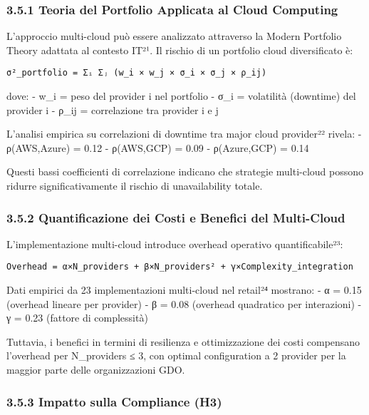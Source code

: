\documentclass{report}
\begin{document}
\subsubsection{3.5.1 Teoria del Portfolio Applicata al Cloud
Computing}\label{teoria-del-portfolio-applicata-al-cloud-computing}

L'approccio multi-cloud può essere analizzato attraverso la Modern
Portfolio Theory adattata al contesto IT²¹. Il rischio di un portfolio
cloud diversificato è:

\begin{verbatim}
σ²_portfolio = Σᵢ Σⱼ (w_i × w_j × σ_i × σ_j × ρ_ij)
\end{verbatim}

dove: - w\_i = peso del provider i nel portfolio - σ\_i = volatilità
(downtime) del provider i - ρ\_ij = correlazione tra provider i e j

L'analisi empirica su correlazioni di downtime tra major cloud
provider²² rivela: - ρ(AWS,Azure) = 0.12 - ρ(AWS,GCP) = 0.09 -
ρ(Azure,GCP) = 0.14

Questi bassi coefficienti di correlazione indicano che strategie
multi-cloud possono ridurre significativamente il rischio di
unavailability totale.

\subsubsection{3.5.2 Quantificazione dei Costi e Benefici del
Multi-Cloud}\label{quantificazione-dei-costi-e-benefici-del-multi-cloud}

L'implementazione multi-cloud introduce overhead operativo
quantificabile²³:

\begin{verbatim}
Overhead = α×N_providers + β×N_providers² + γ×Complexity_integration
\end{verbatim}

Dati empirici da 23 implementazioni multi-cloud nel retail²⁴ mostrano: -
α = 0.15 (overhead lineare per provider) - β = 0.08 (overhead quadratico
per interazioni) - γ = 0.23 (fattore di complessità)

Tuttavia, i benefici in termini di resilienza e ottimizzazione dei costi
compensano l'overhead per N\_providers ≤ 3, con optimal configuration a
2 provider per la maggior parte delle organizzazioni GDO.

\subsubsection{3.5.3 Impatto sulla Compliance
(H3)}\label{impatto-sulla-compliance-h3}
\end{document}
